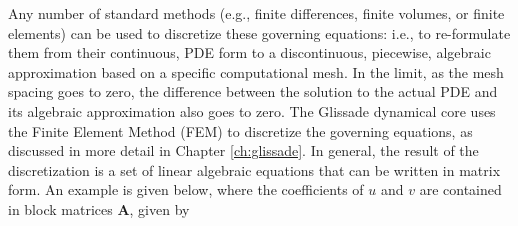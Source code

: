 %

\noindent
Any number of standard methods (e.g., finite differences, finite volumes, or finite elements) can be used to discretize these governing equations: i.e., to re-formulate them from their continuous, PDE form to a discontinuous, piecewise, algebraic approximation based on a specific computational mesh. 
In the limit, as the mesh spacing goes to zero, the difference between the solution to the actual PDE and its algebraic approximation also goes to zero. 
The Glissade dynamical core uses the Finite Element Method (FEM) to discretize the governing equations, as discussed in more detail in Chapter \ref{ch:glissade}. 
In general, the result of the discretization is a set of linear algebraic equations that can be written in matrix form. 
An example is given below, where the coefficients of $u$ and $v$ are contained in block matrices \textbf{A}, given by 


